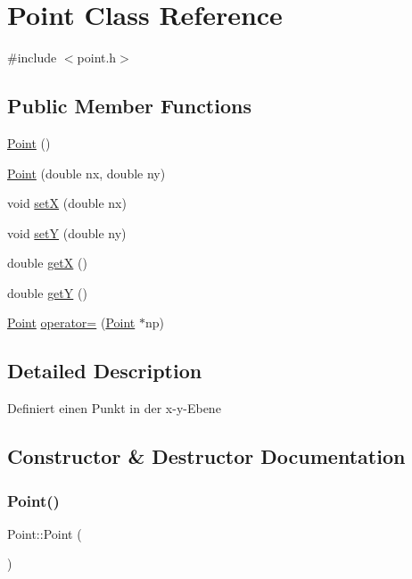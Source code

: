 \hypertarget{class_point}{}\section{Point Class Reference}
\label{class_point}


{\ttfamily \#include $<$point.\+h$>$}

\subsection*{Public Member Functions}
\begin{DoxyCompactItemize}
\item 
\mbox{\hyperlink{class_point_ad92f2337b839a94ce97dcdb439b4325a}{Point}} ()
\item 
\mbox{\hyperlink{class_point_ac48df7076af6d62f06c83dec7210af6f}{Point}} (double nx, double ny)
\item 
void \mbox{\hyperlink{class_point_a62436e2678bfd0a4be0e2729c9d60380}{setX}} (double nx)
\item 
void \mbox{\hyperlink{class_point_a3611975b72fc2279dc91653237bd3cd5}{setY}} (double ny)
\item 
double \mbox{\hyperlink{class_point_a8de35a6098cdd7267b4167776da83da6}{getX}} ()
\item 
double \mbox{\hyperlink{class_point_aa278c8bcb8aeb4101023a4baf473b547}{getY}} ()
\item 
\mbox{\hyperlink{class_point}{Point}} \mbox{\hyperlink{class_point_a4fabca990b4e246773cada554b22ff5d}{operator=}} (\mbox{\hyperlink{class_point}{Point}} $\ast$np)
\end{DoxyCompactItemize}


\subsection{Detailed Description}
Definiert einen Punkt in der x-\/y-\/\+Ebene 

\subsection{Constructor \& Destructor Documentation}
\mbox{\label{class_point_ad92f2337b839a94ce97dcdb439b4325a}} 
\subsubsection{\texorpdfstring{Point()}{Point()}\hspace{0.1cm}{\footnotesize\ttfamily [1/2]}}
{\footnotesize\ttfamily Point\+::\+Point (\begin{DoxyParamCaption}{ }\end{DoxyParamCaption})}

